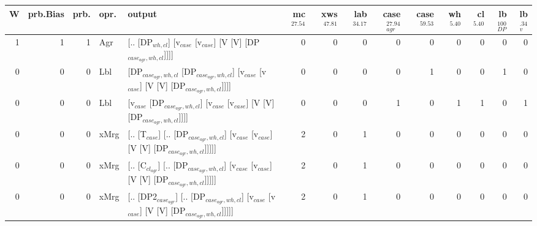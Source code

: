 \begin{tabularx}{\linewidth}{rrrlXrrrrrrrrr}
\hline
   W &   prb.Bias &   prb. & opr.   & output                                                                                                                    &   mc$^{27.54}$ &   xws$^{47.81}$ &   lab$^{34.17}$ &   case$_{agr}^{27.94}$ &   case$^{59.53}$ &   wh$^{5.40}$ &   cl$^{5.40}$ &   lb$_{DP}^{100}$ &   lb$_{v}^{.34}$ \\
\hline
   1 &       1 &   1 & Agr  & [.. [DP$_{wh,cl}$] [v$_{case}$ [v$_{case}$] [V [V] [DP$_{case_{agr},wh,cl}$]]]]                                                             &            0 &             0 &             0 &                  0 &              0 &           0 &           0 &                0 &             0 \\
   0 &       0 &   0 & Lbl  & [DP$_{case_{agr},wh,cl}$ [DP$_{case_{agr},wh,cl}$] [v$_{case}$ [v$_{case}$] [V [V] [DP$_{case_{agr},wh,cl}$]]]]                                     &            0 &             0 &             0 &                  0 &              1 &           0 &           0 &                1 &             0 \\
   0 &       0 &   0 & Lbl  & [v$_{case}$ [DP$_{case_{agr},wh,cl}$] [v$_{case}$ [v$_{case}$] [V [V] [DP$_{case_{agr},wh,cl}$]]]]                                                &            0 &             0 &             0 &                  1 &              0 &           1 &           1 &                0 &             1 \\
   0 &       0 &   0 & xMrg & [.. [T$_{case}$] [.. [DP$_{case_{agr},wh,cl}$] [v$_{case}$ [v$_{case}$] [V [V] [DP$_{case_{agr},wh,cl}$]]]]]                                      &            2 &             0 &             1 &                  0 &              0 &           0 &           0 &                0 &             0 \\
   0 &       0 &   0 & xMrg & [.. [C$_{cl_{agr}}$] [.. [DP$_{case_{agr},wh,cl}$] [v$_{case}$ [v$_{case}$] [V [V] [DP$_{case_{agr},wh,cl}$]]]]]                                    &            2 &             0 &             1 &                  0 &              0 &           0 &           0 &                0 &             0 \\
   0 &       0 &   0 & xMrg & [.. [DP2$_{case_{agr}}$] [.. [DP$_{case_{agr},wh,cl}$] [v$_{case}$ [v$_{case}$] [V [V] [DP$_{case_{agr},wh,cl}$]]]]]                                &            2 &             0 &             1 &                  0 &              0 &           0 &           0 &                0 &             0 \\

\end{tabularx}
